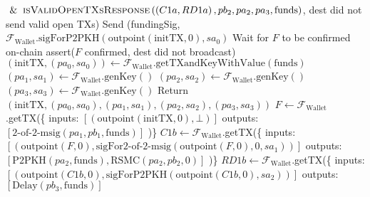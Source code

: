 \begin{algorithmic}[1]
      \Indent
        \State $\And \textsc{isValidOpenTXsResponse}\left(\left(C1a, RD1a\right), pb_2,
        pa_2, pa_3, \mathrm{funds}\right)$,
        \State dest did not send valid open TXs)
      \EndIndent
      \State Send (fundingSig, $\mathcal{F}_{\mathrm{Wallet}}.\text{sigForP2PKH}
      \left(\mathrm{outpoint}\left(\mathrm{initTX}, 0\right), sa_0\right)$
      \State Wait for $F$ to be confirmed on-chain
      \State assert($F$ confirmed, dest did not broadcast) 
    \EndProcedure
    \State
      \State $\left(\mathrm{initTX}, \left(pa_0, sa_0\right)\right) \gets
      \mathcal{F}_{\mathrm{Wallet}}.\mathrm{getTXandKeyWithValue}
      \left(\mathrm{funds}\right)$ 
      \State $\left(pa_1, sa_1\right) \leftarrow
      \mathcal{F}_{\mathrm{Wallet}}.\mathrm{genKey}\left(\right)$ 
      \State $\left(pa_2, sa_2\right) \leftarrow
      \mathcal{F}_{\mathrm{Wallet}}.\mathrm{genKey}\left(\right)$ 
      \State $\left(pa_3, sa_3\right) \leftarrow
      \mathcal{F}_{\mathrm{Wallet}}.\mathrm{genKey}\left(\right)$ 
      \State Return $\left(\mathrm{initTX}, \left(pa_0, sa_0\right), \left(pa_1,
      sa_1\right), \left(pa_2, sa_2\right), \left(pa_3, sa_3\right)\right)$
    \EndProcedure
    \State
      \State $F \gets \mathcal{F}_{\mathrm{Wallet}}$.getTX(\{
      \State inputs: $\left[\left(\mathrm{outpoint}\left(\mathrm{initTX}, 0\right),
      \bot\right)\right]$
      \State outputs: $\left[\text{2-of-2-msig}\left(pa_1, pb_1,
      \mathrm{funds}\right)\right]$
      \State )\}
      \State $C1b \gets \mathcal{F}_{\mathrm{Wallet}}$.getTX(\{
      \State inputs: $\left[\left(\mathrm{outpoint}\left(F, 0\right),
      \text{sigFor2-of-2-msig}\left(\mathrm{outpoint}\left(F, 0\right), 0,
      sa_1\right)\right)\right]$
      \State outputs: $\left[\mathrm{P2PKH}\left(pa_2, \mathrm{funds}\right),
      \mathrm{RSMC}\left(pa_2, pb_2, 0\right)\right]$
      \State )\}
      \State $RD1b \gets \mathcal{F}_{\mathrm{Wallet}}$.getTX(\{
      \State inputs: $\left[\left(\mathrm{outpoint}\left(C1b, 0\right),
      \text{sigForP2PKH}\left(\mathrm{outpoint}\left(C1b, 0\right),
      sa_2\right)\right)\right]$
      \State outputs: $\left[\mathrm{Delay}\left(pb_3, \mathrm{funds}\right)\right]$

\end{algorithmic}
